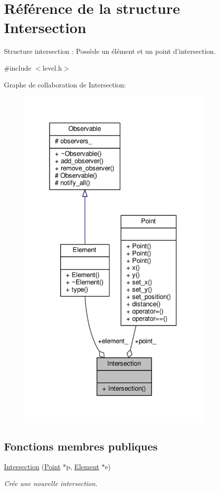 \hypertarget{structIntersection}{\section{Référence de la structure Intersection}
\label{structIntersection}
}


Structure intersection \+: Possède un élément et un point d'intersection.  




{\ttfamily \#include $<$level.\+h$>$}



Graphe de collaboration de Intersection\+:
\nopagebreak
\begin{figure}[H]
\begin{center}
\leavevmode
\includegraphics[width=272pt]{d9/d8e/structIntersection__coll__graph}
\end{center}
\end{figure}
\subsection*{Fonctions membres publiques}
\begin{DoxyCompactItemize}
\item 
\hyperlink{structIntersection_a44d7ebd733fe15894a44f14a63c3d328}{Intersection} (\hyperlink{classPoint}{Point} $\ast$p, \hyperlink{classElement}{Element} $\ast$e)
\begin{DoxyCompactList}\small\item\em Crée une nouvelle intersection. \end{DoxyCompactList}\end{DoxyCompactItemize}
